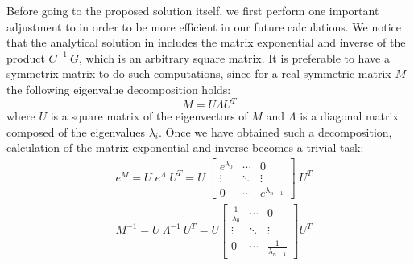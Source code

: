 Before going to the proposed solution itself, we first perform one important adjustment to  in order to be more efficient in our future calculations. We notice that the analytical solution in  includes the matrix exponential and inverse of the product $C^{-1} \: G$, which is an arbitrary square matrix. It is preferable to have a symmetrix matrix to do such computations, since for a real symmetric matrix $M$ the following eigenvalue decomposition holds:
\begin{equation} \label{eq:eigenvalue-decomposition}
  M = U \Lambda U^T
\end{equation}
where $U$ is a square matrix of the eigenvectors of $M$ and $\Lambda$ is a diagonal matrix composed of the eigenvalues $\lambda_i$. Once we have obtained such a decomposition, calculation of the matrix exponential and inverse becomes a trivial task:
\begin{align*}
  & e^M = U \; e^{\Lambda} \; U^T = U \: \left[
      \begin{array}{ccc}
        e^{\lambda_0} & \cdots & 0 \\
        \vdots & \ddots & \vdots \\
        0 & \cdots & e^{\lambda_{n - 1}}
      \end{array}
    \right] \; U^T \\
  & M^{-1} = U \: \Lambda^{-1} \: U^T = U \left[
      \begin{array}{ccc}
        \frac{1}{\lambda_0} & \cdots & 0 \\
        \vdots & \ddots & \vdots \\
        0 & \cdots & \frac{1}{\lambda_{n - 1}}
      \end{array}
    \right] U^T \\
\end{align*}

